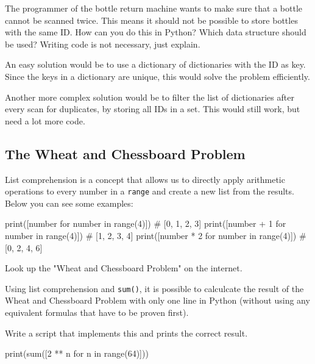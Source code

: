 The programmer of the bottle return machine wants to make sure that a bottle cannot be scanned twice. This means it should not be possible to store bottles with the same ID. How can you do this in Python? Which data structure should be used? Writing code is not necessary, just explain.

\vspace{1em}

\begin{solution}

\noindent An easy solution would be to use a dictionary of dictionaries with the ID as key. Since the keys in a dictionary are unique, this would solve the problem efficiently.

\noindent Another more complex solution would be to filter the list of dictionaries after every scan for duplicates, by storing all IDs in a set. This would still work, but need a lot more code.

\end{solution}

\newpage

\subsection{The Wheat and Chessboard Problem}

List comprehension is a concept that allows us to directly apply arithmetic operations to every number in a \texttt{range} and create a new list from the results. Below you can see some examples:

\begin{pythoncode}
print([number for number in range(4)])     # [0, 1, 2, 3]
print([number + 1 for number in range(4)]) # [1, 2, 3, 4]
print([number * 2 for number in range(4)]) # [0, 2, 4, 6]
\end{pythoncode}

\noindent Look up the "Wheat and Chessboard Problem" on the internet.

\vspace{1em}

\noindent Using list comprehension and \texttt{sum()}, it is possible to calculcate the result of the Wheat and Chessboard Problem with only one line in Python (without using any equivalent formulas that have to be proven first). 

\vspace{1em}

\noindent Write a script that implements this and prints the correct result.

\vspace{1em}

\begin{solution}
	\begin{pythoncode}
print(sum([2 ** n for n in range(64)]))
	\end{pythoncode}
\end{solution}


